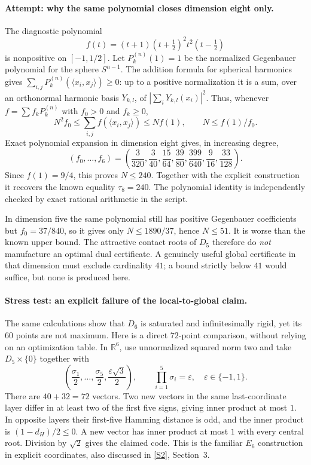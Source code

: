 \documentclass[11pt,a4paper]{article}
\newcommand{\R}{\mathbb{R}}
\newcommand{\sref}[2]{\hyperlink{source:#1:#2}{[S#2]}}
\numberwithin{equation}{section}
\begin{document}
\paragraph{Attempt: why the same polynomial closes dimension eight only.}
The diagnostic polynomial
\[
 f(t)=(t+1)(t+\tfrac12)^2t^2(t-\tfrac12)
\]
is nonpositive on $[-1,1/2]$. Let $P_k^{(n)}(1)=1$ be the normalized
Gegenbauer polynomial for the sphere $S^{n-1}$. The addition formula for
spherical harmonics gives
$\sum_{i,j}P_k^{(n)}(\langle x_i,x_j\rangle)\geq0$:
up to a positive normalization it is a sum, over an orthonormal harmonic
basis $Y_{k,l}$, of $|\sum_iY_{k,l}(x_i)|^2$.
Thus, whenever $f=\sum f_kP_k^{(n)}$ with $f_0>0$ and $f_k\geq0$,
\[
 N^2f_0\leq\sum_{i,j}f(\langle x_i,x_j\rangle)\leq Nf(1),
 \qquad N\leq f(1)/f_0.
\]
Exact polynomial expansion in dimension eight gives, in increasing degree,
\[
 (f_0,\ldots,f_6)=
 \left(\frac3{320},\frac3{40},\frac{15}{64},\frac{39}{80},
       \frac{399}{640},\frac9{16},\frac{33}{128}\right).
\]
Since $f(1)=9/4$, this proves $N\leq240$. Together with the explicit
construction it recovers the known equality $\tau_8=240$.
The polynomial identity is independently checked by exact rational
arithmetic in the script.

In dimension five the same polynomial still has positive Gegenbauer
coefficients but $f_0=37/840$, so it gives only
$N\leq1890/37$, hence $N\leq51$. It is worse than the known upper bound.
The attractive contact roots of $D_5$ therefore do \emph{not} manufacture
an optimal dual certificate. A genuinely useful global certificate in
that dimension must exclude cardinality $41$; a bound strictly below $41$
would suffice, but none is produced here.

\paragraph{Stress test: an explicit failure of the local-to-global claim.}
The same calculations show that $D_6$ is saturated and infinitesimally
rigid, yet its $60$ points are not maximum. Here is a direct $72$-point
comparison, without relying on an optimization table. In $\R^6$, use
unnormalized squared norm two and take $D_5\times\{0\}$ together with
\[
 \left(\frac{\sigma_1}2,\ldots,\frac{\sigma_5}2,
               \frac{\varepsilon\sqrt3}2\right),
 \qquad \prod_{i=1}^5\sigma_i=\varepsilon,
 \quad \varepsilon\in\{-1,1\}.
\]
There are $40+32=72$ vectors. Two new vectors in the same last-coordinate
layer differ in at least two of the first five signs, giving inner product
at most $1$. In opposite layers their first-five Hamming distance is odd,
and the inner product is $(1-d_H)/2\leq0$. A new vector has inner product
at most $1$ with every central root. Division by $\sqrt2$ gives the
claimed code. This is the familiar $E_6$ construction in explicit
coordinates, also discussed in \sref{1369}{2}, Section~3.
\end{document}
